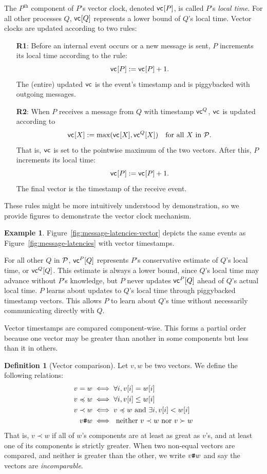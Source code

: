 \documentclass[]             %
{NASA}                       %
\theoremstyle{definition}
\newtheorem{example}[theorem]{Example}
\newtheorem{definition}[theorem]{Definition}
\begin{document}
The $P^\textrm{th}$ component of $P$'s vector clock, denoted
$\mathsf{vc}^{}[P]$, is called $P$'s \emph{local time}. For all other processes
$Q$, $\mathsf{vc}^{}[Q]$ represents a lower bound of $Q$'s local time. Vector
clocks are updated according to two rules:
\begin{enumerate}
\item[\textbf{R1}:] Before an internal event occurs or a new message is sent, $P$
  increments its local time according to the rule:
  \[\mathsf{vc}^{}[P] := \mathsf{vc}^{}[P] + 1.\]
  The (entire) updated $\mathsf{vc}^{}$ is the event's timestamp and is piggybacked with outgoing messages.
\item[\textbf{R2}:] When $P$ receives a message from $Q$ with timestamp
  $\mathsf{vc}^{Q}$, $\mathsf{vc}^{}$ is updated according to
  \[\mathsf{vc}^{}[X] := \max(\mathsf{vc}^{}[X], \mathsf{vc}^{Q}[X]) \quad \textrm{for all $X$ in $\mathcal{P}$}.\]
  That is, $\mathsf{vc}^{}$ is set to the pointwise maximum of the two
  vectors. After this, $P$ increments its local time:
  \[ \mathsf{vc}^{}[P] := \mathsf{vc}^{}[P] + 1.\]
  The final vector is the timestamp of the receive event.
\end{enumerate}
These rules might be more intuitively understood by demonstration, so we provide figures to demonstrate the vector clock mechanism.

\begin{example}
  Figure~\ref{fig:message-latencies-vector} depicts the same events as
  Figure~\ref{fig:message-latencies} with vector timestamps.
\end{example}

For all other $Q$ in $\mathcal{P}$, $\mathsf{vc}^{P}[Q]$ represents $P$'s
conservative estimate of $Q$'s local time, or $\mathsf{vc}^{Q}[Q]$. This
estimate is always a lower bound, since $Q$'s local time may advance
without $P$'s knowledge, but $P$ never updates $\mathsf{vc}^{P}[Q]$ ahead of
$Q$'s actual local time. $P$ learns about updates to $Q$'s local time
through piggybacked timestamp vectors. This allows $P$ to learn about
$Q$'s time without necessarily communicating directly with $Q$.

Vector timestamps are compared component-wise. This forms a partial
order because one vector may be greater than another in some
components but less than it in others.

\begin{definition}[Vector comparison]
  Let $v, w$ be two vectors. We define the following relations:
  \begin{align*}
             v = w &\iff \forall i, v[i] = w[i] \\
  v \preccurlyeq w &\iff \forall i, v[i] \leq w[i] \\
         v \prec w &\iff v \preccurlyeq w \textrm{ and } \exists i, v[i] < w[i] \\
            v {\textrm{\texttt{\#}}} w &\iff \textrm{ neither } v \prec w \textrm{ nor } v \succ w
  \end{align*}
  That is, $v \prec w$ if all of $w$'s components are at least as
  great as $v$'s, and at least one of its components is strictly
  greater. When two non-equal vectors are compared, and neither is
  greater than the other, we write $v {\textrm{\texttt{\#}}} w$ and say the vectors
  are \emph{incomparable}.
\end{definition}
\end{document}
